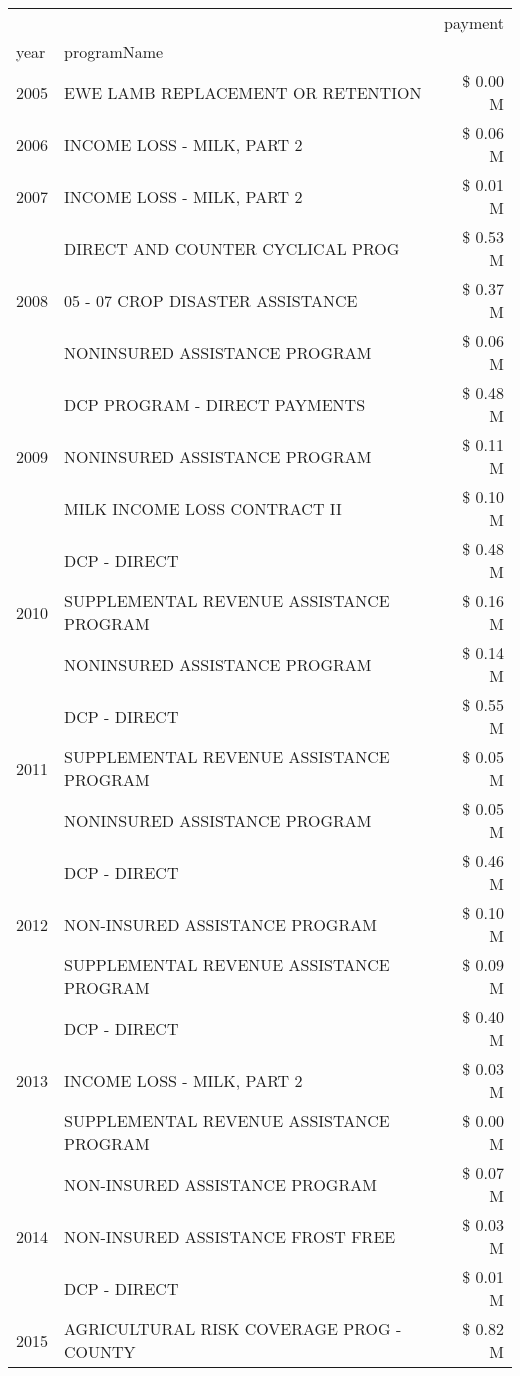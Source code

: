 \begin{tabular}{llr}
\toprule
 &  & payment \\
year & programName &  \\
\midrule
2005 & EWE LAMB REPLACEMENT OR RETENTION & \$ 0.00 M \\
\cline{1-3}
2006 & INCOME LOSS - MILK, PART 2 & \$ 0.06 M \\
\cline{1-3}
2007 & INCOME LOSS - MILK, PART 2 & \$ 0.01 M \\
\cline{1-3}
\multirow[t]{3}{*}{2008} & DIRECT AND COUNTER CYCLICAL PROG & \$ 0.53 M \\
 & 05 - 07 CROP DISASTER ASSISTANCE & \$ 0.37 M \\
 & NONINSURED ASSISTANCE PROGRAM & \$ 0.06 M \\
\cline{1-3}
\multirow[t]{3}{*}{2009} & DCP PROGRAM - DIRECT PAYMENTS & \$ 0.48 M \\
 & NONINSURED ASSISTANCE PROGRAM & \$ 0.11 M \\
 & MILK INCOME LOSS CONTRACT II & \$ 0.10 M \\
\cline{1-3}
\multirow[t]{3}{*}{2010} & DCP - DIRECT & \$ 0.48 M \\
 & SUPPLEMENTAL REVENUE ASSISTANCE PROGRAM & \$ 0.16 M \\
 & NONINSURED ASSISTANCE PROGRAM & \$ 0.14 M \\
\cline{1-3}
\multirow[t]{3}{*}{2011} & DCP - DIRECT & \$ 0.55 M \\
 & SUPPLEMENTAL REVENUE ASSISTANCE PROGRAM & \$ 0.05 M \\
 & NONINSURED ASSISTANCE PROGRAM & \$ 0.05 M \\
\cline{1-3}
\multirow[t]{3}{*}{2012} & DCP - DIRECT & \$ 0.46 M \\
 & NON-INSURED ASSISTANCE PROGRAM & \$ 0.10 M \\
 & SUPPLEMENTAL REVENUE ASSISTANCE PROGRAM & \$ 0.09 M \\
\cline{1-3}
\multirow[t]{3}{*}{2013} & DCP - DIRECT & \$ 0.40 M \\
 & INCOME LOSS - MILK, PART 2 & \$ 0.03 M \\
 & SUPPLEMENTAL REVENUE ASSISTANCE PROGRAM & \$ 0.00 M \\
\cline{1-3}
\multirow[t]{3}{*}{2014} & NON-INSURED ASSISTANCE PROGRAM & \$ 0.07 M \\
 & NON-INSURED ASSISTANCE FROST FREE & \$ 0.03 M \\
 & DCP - DIRECT & \$ 0.01 M \\
\cline{1-3}
\multirow[t]{3}{*}{2015} & AGRICULTURAL RISK COVERAGE PROG - COUNTY & \$ 0.82 M \\

\end{tabular}
